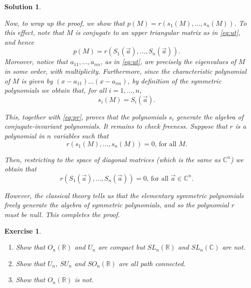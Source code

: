 \documentclass{article}
\newtheorem{ex}{Exercise}
\theoremstyle{nonumberplain}
\newtheorem{sol}{Solution}
\newcommand{\R}{\mathbb{R}}
\newcommand{\C}{\mathbb{C}}
\begin{document}
\begin{sol}
\begin{enumerate}
Now, to wrap up the proof, we show that $p(M) = r(s_1(M), \dots, s_n(M))$. To this effect, note that $M$ is conjugate to an upper triangular matrix as in \eqref{eq:ut}, and hence
\begin{equation}\label{eq:pr}
p(M) = r(S_1(\vec a), \dots, S_n(\vec a)).
\end{equation}
Moreover, notice that $a_{11}, \dots, a_{nn}$, as in \eqref{eq:ut}, are precisely the eigenvalues of $M$ in some order, with multiplicity. Furthermore, since the characteristic polynomial of $M$ is given by $(x-a_{11})\dots(x-a_{nn})$, by definition of the symmetric polynomials we obtain that, for all $i = 1, \dots, n$,
\begin{equation}
s_i(M) = S_i(\vec a).
\end{equation}

This, together with \eqref{eq:pr}, proves that the polynomials $s_i$ generate the algebra of conjugate-invariant polynomials. It remains to check freeness. Suppose that $r$ is a polynomial in $n$ variables such that
\begin{equation}
r(s_1(M), \dots, s_n(M)) = 0 \text{, for all $M$.}
\end{equation}

Then, restricting to the space of diagonal matrices (which is the same as 
$\C^n$) we obtain that
\begin{equation}
r(S_1(\vec a), \dots, S_n(\vec a)) = 0 \text{, for all $\vec a \in \C^n$.}
\end{equation}

However, the classical theory tells us that the elementary symmetric polynomials freely generate the algebra of symmetric polynomials, and so the polynomial $r$ must be null. This completes the proof.
\end{enumerate}
\end{sol}

\begin{ex}\leavevmode
\begin{enumerate}
\item Show that $O_n(\R)$ and $U_n$ are compact but $SL_n(\R)$ and $SL_n(\C)$ are not.

\item Show that $U_n$, $SU_n$ and $SO_n(\R)$ are all path connected.

\item Show that $O_n(\R)$ is not.
\end{enumerate}
\end{ex}
\end{document}
